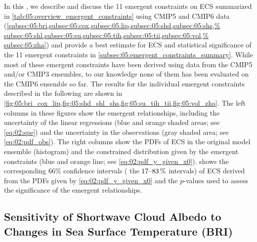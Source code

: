 In this , we describe and
discuss the 11 emergent constraints on \ac{ECS} summarized in
\cref{tab:05:overview_emergent_constraints} using \acs{CMIP}5 and \acs{CMIP}6
data
(\cref{subsec:05:bri,subsec:05:cox,subsec:05:lip,subsec:05:shd,subsec:05:shs,%
  subsec:05:shl,subsec:05:su,subsec:05:tih,subsec:05:tii,subsec:05:vol,%
  subsec:05:zha}) and provide a best estimate for \ac{ECS} and statistical
significance of the 11 emergent constraints in
\cref{subsec:05:emergent_constraints_summary}. While most of these emergent
constraints have been derived using data from the \acs{CMIP}5 and/or
\acs{CMIP}3 ensembles, to our knowledge none of them has been evaluated on
the \acs{CMIP}6 ensemble so far. The results for the individual emergent
constraints described in the following are shown in
\cref{fig:05:bri_cox_lip,fig:05:shd_shl_shs,fig:05:su_tih_tii,fig:05:vol_zha}.
The left columns in these figures show the emergent relationships, including
the uncertainty of the linear regressions (blue and orange shaded areas; see
\cref{eq:02:spe}) and the uncertainty in the observations (gray shaded area;
see \cref{eq:02:pdf_obs}). The right columns show the \acp{PDF} of \ac{ECS} in
the original model ensemble (histogram) and the constrained distribution given
by the emergent constraints (blue and orange line; see
\cref{eq:02:pdf_y_given_x0}).  shows the
corresponding $66 \unit{\%}$ confidence intervals (\ie{} the
$\rangeunit{17}{83}{\%}$ intervals) of \ac{ECS} derived from the \acp{PDF}
given by \cref{eq:02:pdf_y_given_x0} and the $p$-values used to assess the
significance of the emergent relationships.


\subsection{Sensitivity of Shortwave Cloud Albedo to Changes in Sea Surface
  Temperature (BRI)}
\label{subsec:05:bri}

